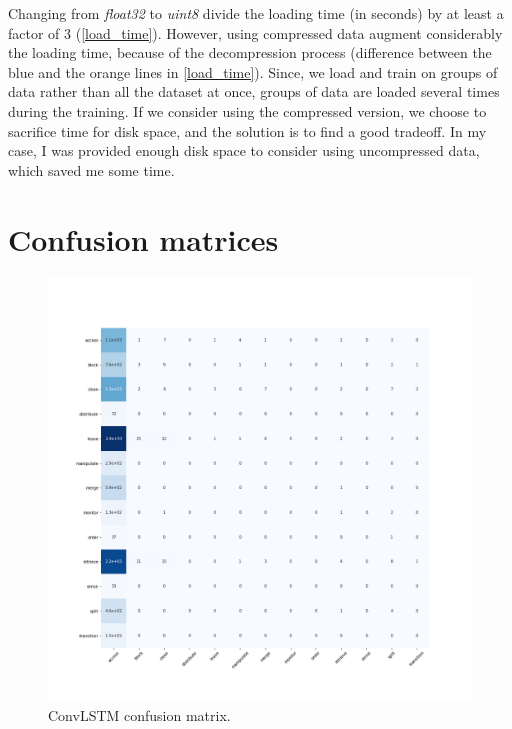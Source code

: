 \documentclass[12pt, a4paper]{report}
\begin{document}
		Changing from {\itshape float32} to {\itshape uint8} divide the loading time (in seconds) by at least a factor of 3 (\ref{load_time}).
		However, using compressed data augment considerably the loading time, because of the decompression process (difference between the blue and the orange lines in \ref{load_time}).
		Since, we load and train on groups of data rather than all the dataset at once, groups of data are loaded several times during the training.
		If we consider using the compressed version, we choose to sacrifice time for disk space, and the solution is to find a good tradeoff.
		In my case, I was provided enough disk space to consider using uncompressed data, which saved me some time.
	\chapter{Confusion matrices}\label{appendix_e}
		\begin{figure}[h!]
			\centering
			\includegraphics[width=1.\textwidth]{cfs_mtrx/epic55_ConvLSTM_0_last.tf.npz_0.png}
			\caption{ConvLSTM confusion matrix.}
			\label{cfs_mtrx_convlstm}
		\end{figure}
\end{document}
